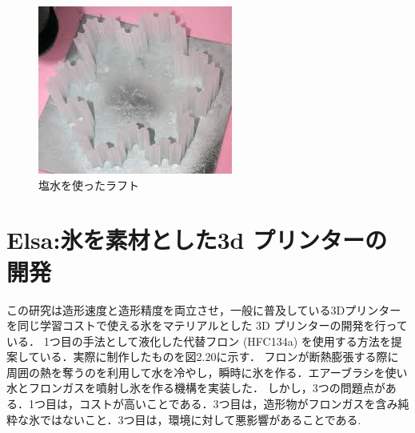 \begin{figure}[H]
  \centering
  \includegraphics[width=9truecm]{./fig/Robo.png}
  \caption{塩水を使ったラフト}
  \label{fig:ferret}
\end{figure}


\section{Elsa:氷を素材とした3d プリンターの開発\cite{h}}
\label{sec:enum}
この研究は造形速度と造形精度を両立させ，一般に普及している3Dプリンターを同じ学習コストで使える氷をマテリアルとした 3D プリンターの開発を行っている．
1つ目の手法として液化した代替フロン (HFC134a) を使用する方法を提案している．実際に制作したものを図2.20に示す．
フロンが断熱膨張する際に周囲の熱を奪うのを利用して水を冷やし，瞬時に氷を作る．エアーブラシを使い水とフロンガスを噴射し氷を作る機構を実装した．
しかし，3つの問題点がある．1つ目は，コストが高いことである．3つ目は，造形物がフロンガスを含み純粋な氷ではないこと．3つ目は，環境に対して悪影響があることである.

